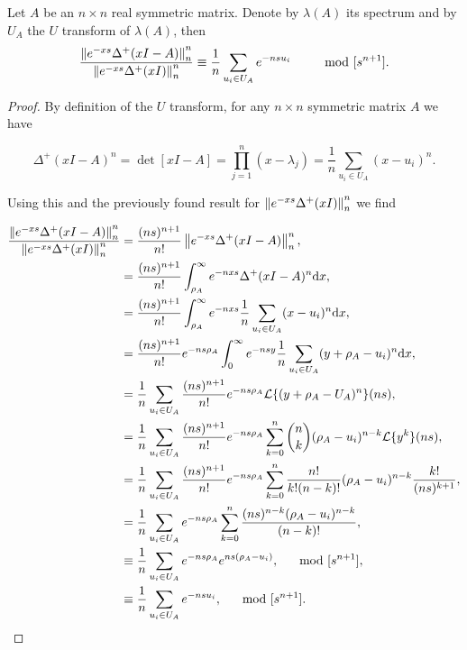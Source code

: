 \begin{lemma}  \label{lemma:quotient_norms}
    Let $A$ be an $n\times n$ real symmetric matrix. Denote by $\lambda(A)$ its spectrum and by $U_A$ the $U$ transform of $\lambda(A)$, then 
    \begin{equation*}
        \frac{\left\lVert e^{-xs}\Delta^+(xI - A)\right\rVert_n^n}{\left\lVert e^{-xs}\Delta^+(xI)\right\rVert_n^n} \equiv \frac1n\sum_{u_i \in U_A} e^{-ns u_i} \qquad \mod [s^{n+1}]. 
    \end{equation*} 
\end{lemma}

\begin{proof}
    By definition of the $U$ transform, for any $n\times n$ symmetric matrix $A$ we have


    \begin{equation*}
        \Delta^+(xI - A)^n = \det[xI - A] = \prod_{j=1}^n (x - \lambda_j) = \frac1n \sum_{u_i \in U_A} (x-u_i)^n.
    \end{equation*}

    Using this and the previously found result for $\left\lVert e^{-xs}\Delta^+(xI)\right\rVert_n^n$ we find

    \begin{align*}
        \frac{\left\lVert e^{-xs}\Delta^+(xI - A)\right\rVert_n^n}{\left\lVert e^{-xs}\Delta^+(xI)\right\rVert_n^n} &= \frac{(ns)^{n+1}}{n!}\left\lVert e^{-xs}\Delta^+(xI - A)\right\rVert_n^n,\\
        &= \frac{(ns)^{n+1}}{n!}\int_{\rho_A}^\infty e^{-nxs} \Delta^+(xI - A)^n \mathrm d x,\\
        &= \frac{(ns)^{n+1}}{n!}\int_{\rho_A}^\infty e^{-nxs} \frac1n \sum_{u_i \in U_A} (x-u_i)^n \mathrm d x,\\
        &= \frac{(ns)^{n+1}}{n!}e^{-ns\rho_A}\int_{0}^\infty e^{-nsy} \frac1n \sum_{u_i \in U_A} (y + \rho_A-u_i)^n \mathrm d x, \\
        &= \frac1n \sum_{u_i\in U_A} \frac{(ns)^{n+1}}{n!}e^{-ns\rho_A} \mathcal L\{(y + \rho_A - U_A)^n\}(ns), \\
        &=  \frac1n \sum_{u_i\in U_A} \frac{(ns)^{n+1}}{n!}e^{-ns\rho_A} \sum_{k=0}^n \binom nk  (\rho_A - u_i)^{n-k}\mathcal L\{y^k\}(ns), \\
        &= \frac1n \sum_{u_i\in U_A} \frac{(ns)^{n+1}}{n!}e^{-ns\rho_A} \sum_{k=0}^n \frac{n!}{k!(n-k)!}  (\rho_A - u_i)^{n-k}\frac{k!}{(ns)^{k+1}}, \\
        &= \frac1n \sum_{u_i \in U_A} e^{-ns\rho_A} \sum_{k=0}^n \frac{(ns)^{n-k}(\rho_A - u_i)^{n-k}}{(n-k)!}, \\
        &\equiv \frac1n \sum_{u_i\in U_A} e^{-ns\rho_A} e^{ns(\rho_A - u_i)}, \quad \mod [s^{n+1}],\\
        &\equiv \frac1n \sum_{u_i\in U_A} e^{-nsu_i}, \quad \mod [s^{n+1}].
    \end{align*}
\end{proof}

